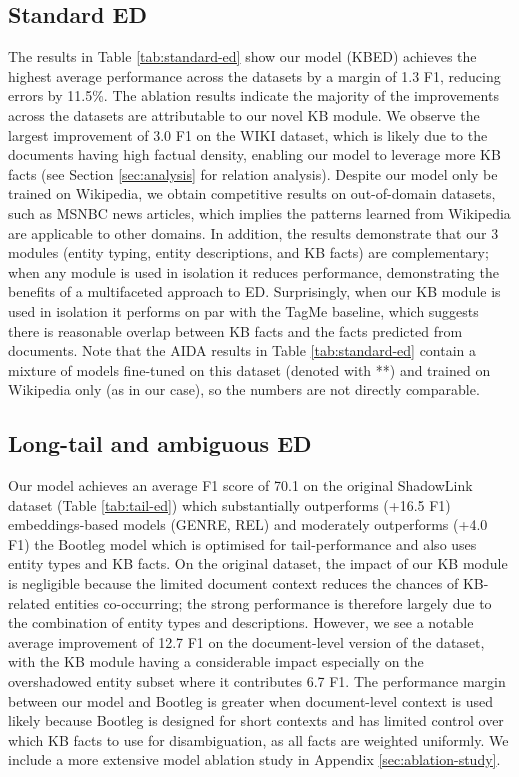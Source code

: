 \documentclass[11pt]{article}
\begin{document}
\subsection{Standard ED}
The results in Table \ref{tab:standard-ed} show our model (KBED) achieves the highest average performance across the datasets by a margin of 1.3 F1, reducing errors by 11.5\%. The ablation results indicate the majority of the improvements across the datasets are attributable to our novel KB module. We observe the largest improvement of 3.0 F1 on the WIKI dataset, which is likely due to the documents having high factual density, enabling our model to leverage more KB facts (see Section \ref{sec:analysis} for relation analysis). Despite our model only be trained on Wikipedia, we obtain competitive results on out-of-domain datasets, such as MSNBC news articles, which implies the patterns learned from Wikipedia are applicable to other domains. In addition, the results demonstrate that our 3 modules (entity typing, entity descriptions, and KB facts) are complementary; when any module is used in isolation it reduces performance, demonstrating the benefits of a multifaceted approach to ED. Surprisingly, when our KB module is used in isolation it performs on par with the TagMe baseline, which suggests there is reasonable overlap between KB facts and the facts predicted from documents. Note that the AIDA results in Table \ref{tab:standard-ed} contain a mixture of models fine-tuned on this dataset (denoted with **) and trained on Wikipedia only (as in our case), so the numbers are not directly comparable.





\subsection{Long-tail and ambiguous ED}
Our model achieves an average F1 score of 70.1 on the original ShadowLink dataset (Table \ref{tab:tail-ed}) which substantially outperforms (+16.5 F1) embeddings-based models (GENRE, REL) and moderately outperforms (+4.0 F1) the Bootleg model \cite{bootleg} which is optimised for tail-performance and also uses entity types and KB facts. On the original dataset, the impact of our KB module is negligible because the limited document context reduces the chances of KB-related entities co-occurring; the strong performance is therefore largely due to the combination of entity types and descriptions. However, we see a notable average improvement of 12.7 F1 on the document-level version of the dataset, with the KB module having a considerable impact especially on the overshadowed entity subset where it contributes 6.7 F1. The performance margin between our model and Bootleg is greater when document-level context is used likely because Bootleg is designed for short contexts and has limited control over which KB facts to use for disambiguation, as all facts are weighted uniformly. We include a more extensive model ablation study in Appendix \ref{sec:ablation-study}.
\end{document}
